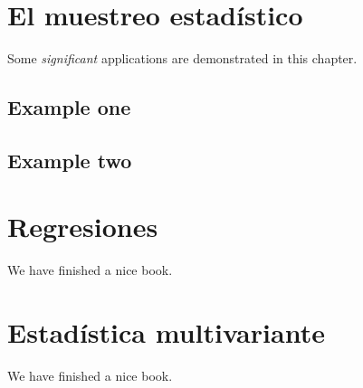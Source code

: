 \documentclass[
]{book}
\begin{document}
\hypertarget{el-muestreo-estaduxedstico}{%
\chapter{El muestreo estadístico}\label{el-muestreo-estaduxedstico}}

Some \emph{significant} applications are demonstrated in this chapter.

\hypertarget{example-one}{%
\section{Example one}\label{example-one}}

\hypertarget{example-two}{%
\section{Example two}\label{example-two}}

\hypertarget{regresiones}{%
\chapter{Regresiones}\label{regresiones}}

We have finished a nice book.

\hypertarget{estaduxedstica-multivariante}{%
\chapter{Estadística multivariante}\label{estaduxedstica-multivariante}}

We have finished a nice book.

  
\end{document}
